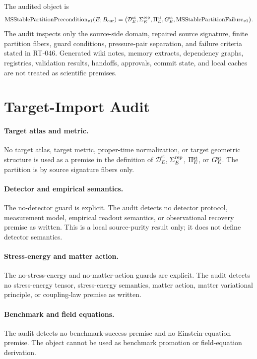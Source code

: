 The audited object is
\[
  \mathrm{MSStablePartitionPrecondition}_{v1}(E;B_{\mathrm{cur}})=
  \bigl(\mathcal D^{\mathrm{st}}_E,\Sigma^{\mathrm{rep}}_E,\Pi^{\mathrm{st}}_E,G^{\mathrm{st}}_E,\mathrm{MSStablePartitionFailure}_{v1}\bigr).
\]
The audit inspects only the source-side domain, repaired source signature,
finite partition fibers, guard conditions, pressure-pair separation, and
failure criteria stated in RT-046. Generated wiki notes, memory extracts,
dependency graphs, registries, validation results, handoffs, approvals,
commit state, and local caches are not treated as scientific premises.

\section{Target-Import Audit}

\paragraph{Target atlas and metric.}
No target atlas, target metric, proper-time normalization, or target
geometric structure is used as a premise in the definition of
\(\mathcal D^{\mathrm{st}}_E\), \(\Sigma^{\mathrm{rep}}_E\), \(\Pi^{\mathrm{st}}_E\), or
\(G^{\mathrm{st}}_E\). The partition is by source signature fibers only.

\paragraph{Detector and empirical semantics.}
The no-detector guard is explicit. The audit detects no detector protocol,
measurement model, empirical readout semantics, or observational recovery
premise as written. This is a local source-purity result only; it does not
define detector semantics.

\paragraph{Stress-energy and matter action.}
The no-stress-energy and no-matter-action guards are explicit. The audit
detects no stress-energy tensor, stress-energy semantics, matter action,
matter variational principle, or coupling-law premise as written.

\paragraph{Benchmark and field equations.}
The audit detects no benchmark-success premise and no Einstein-equation
premise. The object cannot be used as benchmark promotion or field-equation
derivation.

